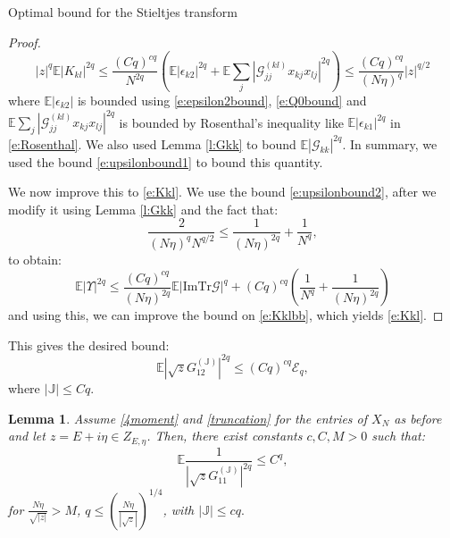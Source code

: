 \documentclass[11pt, a4paper, oneside]{book}
\numberwithin{equation}{chapter}
\newcommand{\E}{\mathbb E}
\newcommand{\J}{\mathbb J}
\newcommand{\Tr}{\mathrm{Tr}}
\newtheorem{lem}[thm]{Lemma}
\begin{document}
\begin{section}{Optimal bound for the Stieltjes transform}
\begin{proof}
%
\begin{equation} \label{e:Kklbb}
|z|^q \E | K_{kl} |^{2q} \leq \frac{(Cq)^{cq}}{N^{2q}} \left( \E |\epsilon_{k2}|^{2q} + \E \sum_j|\mathcal{G}^{(kl)}_{jj}x_{kj}x_{lj}|^{2q}\right)
\leq
 \frac{(Cq)^{cq}}{(N\eta)^q} |z|^{q/2}
\end{equation}
%
where $\E |\epsilon_{k2}|$ is bounded using \eqref{e:epsilon2bound}, \eqref{e:Q0bound} and $\E \sum \limits_j |\mathcal{G}^{(kl)}_{jj}x_{kj}x_{lj}|^{2q}$ is bounded by Rosenthal's inequality like $\E|\epsilon_{k1}|^{2q}$ in \eqref{e:Rosenthal}. We also used Lemma \ref{l:Gkk} to bound $\E |\mathcal{G}_{kk}|^{2q}$. In summary, we used the bound \eqref{e:upsilonbound1} to bound this quantity.

We now improve this to \eqref{e:Kkl}. We use the bound \eqref{e:upsilonbound2}, after we modify it using Lemma \ref{l:Gkk} and the fact that: $$ \frac{2}{(N\eta)^qN^{q/2}} \leq \frac{1}{(N\eta)^{2q}}+ \frac{1}{N^{q}},$$ to obtain:
%
\begin{equation}\label{e:upsilonboundoptimal} \E|\Upsilon|^{2q} \leq \frac{(Cq)^{cq}}{(N\eta)^{2q}}\E|\mathrm{Im}\Tr \mathcal{G}|^q   + (Cq)^{cq}\left(\frac{1}{N^q}+\frac{1}{(N\eta)^{2q}}\right)\end{equation}
%
and using this, we can improve the bound on \eqref{e:Kklbb}, which yields \eqref{e:Kkl}.
%
\end{proof}
%
This gives the desired bound:
\begin{equation} \label{off-diag1}
    \E |\sqrt{z} G_{12}^{(\J)}|^{2q} \leq (Cq)^{cq} \mathcal{E} _{q},
\end{equation}
%
where $|\mathbb{J} | \leq Cq.$
%
\begin{lem} \label{reciprocal}
Assume \eqref{4moment} and \eqref{truncation} for the entries of $X_N$ as before and let $z=E+i\eta \in Z_{E,\eta}$. Then, there exist constants $c,C,M>0$ such that:
%
$$ \E \frac{1}{| \sqrt{z} G_{11}^{(\mathbb{J})}|^{2q } } \leq C^q ,$$
%
for $ \frac{N\eta}{\sqrt{|z|}} > M$, $q\leq \left (\frac{N\eta}{|\sqrt{z}|} \right )^{1/4} $, with $|\mathbb{J}| \leq cq.$
\end{lem}


\end{section}
\end{document}
